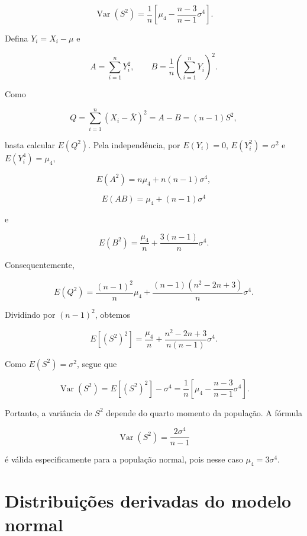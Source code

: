\documentclass[
  letterpaper,
  DIV=11,
  numbers=noendperiod]{scrreprt}
\begin{document}
\[\operatorname{Var}(S^2)
=
\frac{1}{n}
\left[
\mu_4-
\frac{n-3}{n-1}\sigma^4
\right].\]

\begin{tcolorbox}[enhanced jigsaw, colback=white, leftrule=.75mm, colbacktitle=quarto-callout-note-color!10!white, breakable, titlerule=0mm, bottomtitle=1mm, title=\textcolor{quarto-callout-note-color}{\faInfo}\hspace{0.5em}{Demonstração --- Variância de \(S^2\)}, colframe=quarto-callout-note-color-frame, toprule=.15mm, opacityback=0, bottomrule=.15mm, opacitybacktitle=0.6, arc=.35mm, toptitle=1mm, rightrule=.15mm, coltitle=black, left=2mm]

Defina \(Y_i=X_i-\mu\) e

\[A=\sum_{i=1}^nY_i^2,
\qquad
B=\frac{1}{n}\left(\sum_{i=1}^nY_i\right)^2.\]

Como

\[Q=\sum_{i=1}^n(X_i-\overline{X})^2=A-B=(n-1)S^2,\]

basta calcular \(E(Q^2)\). Pela independência, por \(E(Y_i)=0\),
\(E(Y_i^2)=\sigma^2\) e \(E(Y_i^4)=\mu_4\),

\[E(A^2)=n\mu_4+n(n-1)\sigma^4,\]

\[E(AB)=\mu_4+(n-1)\sigma^4\]

e

\[E(B^2)=\frac{\mu_4}{n}+\frac{3(n-1)}{n}\sigma^4.\]

Consequentemente,

\[E(Q^2)
=
\frac{(n-1)^2}{n}\mu_4
+
\frac{(n-1)(n^2-2n+3)}{n}\sigma^4.\]

Dividindo por \((n-1)^2\), obtemos

\[E[(S^2)^2]
=
\frac{\mu_4}{n}
+
\frac{n^2-2n+3}{n(n-1)}\sigma^4.\]

Como \(E(S^2)=\sigma^2\), segue que

\[\operatorname{Var}(S^2)
=E[(S^2)^2]-\sigma^4
=
\frac{1}{n}
\left[
\mu_4-
\frac{n-3}{n-1}\sigma^4
\right].\]

\end{tcolorbox}

Portanto, a variância de \(S^2\) depende do quarto momento da população.
A fórmula

\[\operatorname{Var}(S^2)=\frac{2\sigma^4}{n-1}\]

é válida especificamente para a população normal, pois nesse caso
\(\mu_4=3\sigma^4\).

\section{Distribuições derivadas do modelo
normal}\label{distribuiuxe7uxf5es-derivadas-do-modelo-normal}
\end{document}
